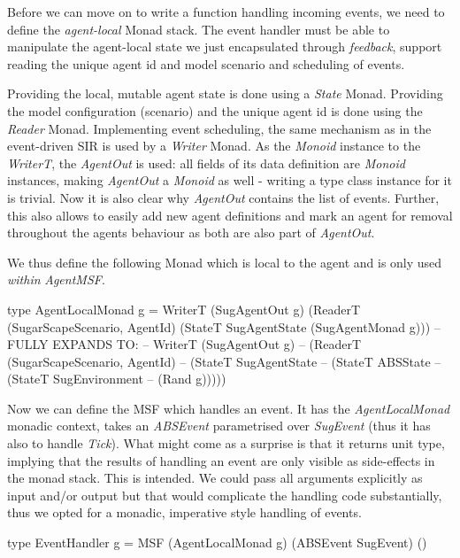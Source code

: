 Before we can move on to write a function handling incoming events, we need to define the \textit{agent-local} Monad stack. The event handler must be able to manipulate the agent-local state we just encapsulated through \textit{feedback}, support reading the unique agent id and model scenario and scheduling of events.

Providing the local, mutable agent state is done using a \textit{State} Monad. Providing the model configuration (scenario) and the unique agent id is done using the \textit{Reader} Monad. Implementing event scheduling, the same mechanism as in the event-driven SIR is used by a \textit{Writer} Monad. As the \textit{Monoid} instance to the \textit{WriterT}, the \textit{AgentOut} is used: all fields of its data definition are \textit{Monoid} instances, making \textit{AgentOut} a \textit{Monoid} as well - writing a type class instance for it is trivial. Now it is also clear why \textit{AgentOut} contains the list of events. Further, this also allows to easily add new agent definitions and mark an agent for removal throughout the agents behaviour as both are also part of \textit{AgentOut}.

We thus define the following Monad which is local to the agent and is only used \textit{within} \textit{AgentMSF}.

\begin{HaskellCode}
type AgentLocalMonad g = WriterT (SugAgentOut g) 
                           (ReaderT (SugarScapeScenario, AgentId) 
                             (StateT SugAgentState (SugAgentMonad g)))     
-- FULLY EXPANDS TO:
-- WriterT (SugAgentOut g) 
--  (ReaderT (SugarScapeScenario, AgentId) 
--    (StateT SugAgentState 
--      (StateT ABSState 
--        (StateT SugEnvironment 
--          (Rand g)))))
\end{HaskellCode}

Now we can define the MSF which handles an event. It has the \textit{AgentLocalMonad} monadic context, takes an \textit{ABSEvent} parametrised over \textit{SugEvent} (thus it has also to handle \textit{Tick}). What might come as a surprise is that it returns unit type, implying that the results of handling an event are only visible as side-effects in the monad stack. This is intended. We could pass all arguments explicitly as input and/or output but that would complicate the handling code substantially, thus we opted for a monadic, imperative style handling of events.

\begin{HaskellCode}
type EventHandler g = MSF (AgentLocalMonad g) (ABSEvent SugEvent) ()
\end{HaskellCode}

